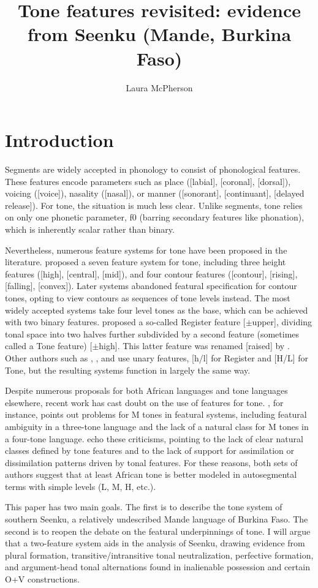 \documentclass[output=paper]{langsci/langscibook}
\title{Tone features revisited: evidence from Seenku (Mande, Burkina Faso)}
\author{%
Laura McPherson \affiliation{Dartmouth College} 
}
\begin{document}
 \section{Introduction}
 
 Segments are widely accepted in phonology to consist of phonological features. These features encode parameters such as place ([labial], [coronal], [dorsal]), voicing ([voice]), nasality ([nasal]), or manner ([sonorant], [continuant], [delayed release]). For tone, the situation is much less clear. Unlike segments, tone relies on only one phonetic parameter, f0 (barring secondary features like phonation), which is inherently scalar rather than binary.
 
Nevertheless, numerous feature systems for tone have been proposed in the literature. \citet{Wang67} proposed a seven feature system for tone, including three height features ([high], [central], [mid]), and four contour features ([contour], [rising], [falling], [convex]). Later systems abandoned featural specification for contour tones, opting to view contours as sequences of tone levels instead. The most widely accepted systems take four level tones as the base, which can be achieved with two binary features. \citet{Yip80} proposed a so-called Register feature [$\pm$upper], dividing tonal space into two halves further subdivided by a second feature (sometimes called a Tone feature) [$\pm$high]. This latter feature was renamed [raised] by \citet{Pulleyblank86}. Other authors such as \citet{Clements83}, \citet{Snider90}, and \citet{Hyman93} use unary features, [h/l] for Register and [H/L] for Tone, but the resulting systems function in largely the same way.

Despite numerous proposals for both African languages and tone languages elsewhere, recent work has cast doubt on the use of features for tone. \citet{Hyman10b}, for instance, points out problems for M tones in featural systems, including featural ambiguity in a three-tone language and the lack of a natural class for M tones in a four-tone language. \citet{Clementsetal10} echo these criticisms, pointing to the lack of clear natural classes defined by tone features and to the lack of support for assimilation or dissimilation patterns driven by tonal features. For these reasons, both sets of authors suggest that at least African tone is better modeled in autosegmental terms with simple levels (L, M, H, etc.).

This paper has two main goals. The first is to describe the tone system of southern Seenku, a relatively undescribed Mande language of Burkina Faso. The second is to reopen the debate on the featural underpinnings of tone. I will argue that a two-feature system aids in the analysis of Seenku, drawing evidence from plural formation, transitive/intransitive tonal neutralization, perfective formation, and argument-head tonal alternations found in inalienable possession and certain O+V constructions.
\end{document}
